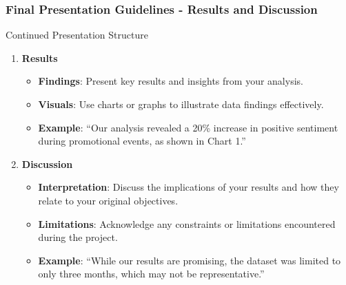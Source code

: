 \documentclass[aspectratio=169]{beamer}
\begin{document}
\begin{frame}[fragile]
    \frametitle{Final Presentation Guidelines - Results and Discussion}
    \begin{block}{Continued Presentation Structure}
        \begin{enumerate}[resume]
            \item \textbf{Results}
                \begin{itemize}
                    \item \textbf{Findings}: Present key results and insights from your analysis.
                    \item \textbf{Visuals}: Use charts or graphs to illustrate data findings effectively.
                    \item \textbf{Example}: ``Our analysis revealed a 20\% increase in positive sentiment during promotional events, as shown in Chart 1.''
                \end{itemize}
                
            \item \textbf{Discussion}
                \begin{itemize}
                    \item \textbf{Interpretation}: Discuss the implications of your results and how they relate to your original objectives.
                    \item \textbf{Limitations}: Acknowledge any constraints or limitations encountered during the project.
                    \item \textbf{Example}: ``While our results are promising, the dataset was limited to only three months, which may not be representative.''
                \end{itemize}
        \end{enumerate}
    \end{block}
\end{frame}
\end{document}
